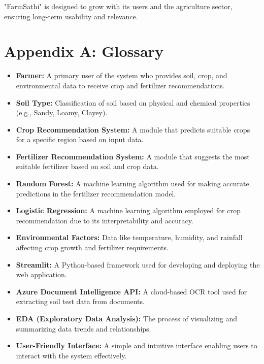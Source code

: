\documentclass{scrreprt}
\begin{document}
"FarmSathi" is designed to grow with its users and the agriculture sector, ensuring long-term usability and relevance.

\chapter{Appendix A: Glossary}
\begin{itemize}
    \item \textbf{Farmer:} A primary user of the system who provides soil, crop, and environmental data to receive crop and fertilizer recommendations.
    \item \textbf{Soil Type:} Classification of soil based on physical and chemical properties (e.g., Sandy, Loamy, Clayey).
    \item \textbf{Crop Recommendation System:} A module that predicts suitable crops for a specific region based on input data.
    \item \textbf{Fertilizer Recommendation System:} A module that suggests the most suitable fertilizer based on soil and crop data.
    \item \textbf{Random Forest:} A machine learning algorithm used for making accurate predictions in the fertilizer recommendation model.
    \item \textbf{Logistic Regression:} A machine learning algorithm employed for crop recommendation due to its interpretability and accuracy.
    \item \textbf{Environmental Factors:} Data like temperature, humidity, and rainfall affecting crop growth and fertilizer requirements.
    \item \textbf{Streamlit:} A Python-based framework used for developing and deploying the web application.
    \item \textbf{Azure Document Intelligence API:} A cloud-based OCR tool used for extracting soil test data from documents.
    \item \textbf{EDA (Exploratory Data Analysis):} The process of visualizing and summarizing data trends and relationships.
    \item \textbf{User-Friendly Interface:} A simple and intuitive interface enabling users to interact with the system effectively.
\end{itemize}
\end{document}
